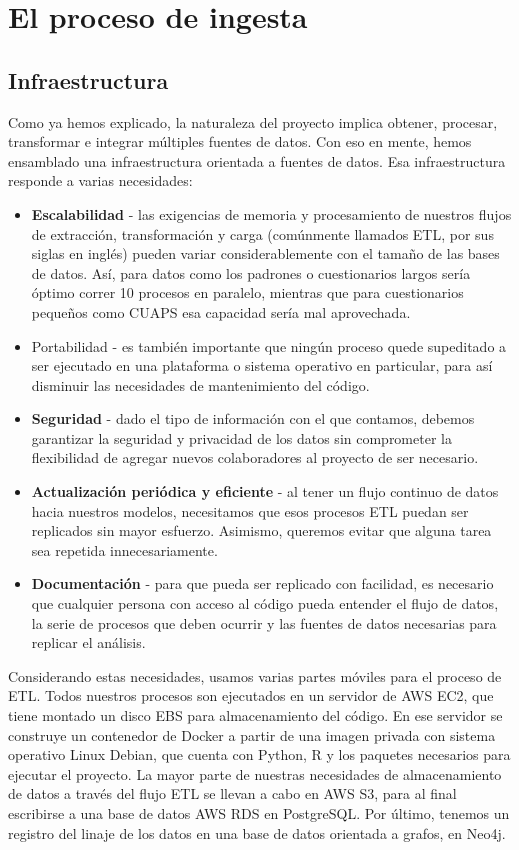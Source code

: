 \chapter*{El proceso de ingesta}
\label{chap:ingesta}
\section*{Infraestructura}
Como ya hemos explicado, la naturaleza del proyecto implica obtener, procesar, transformar e integrar múltiples fuentes de datos. Con eso en mente, hemos ensamblado una infraestructura orientada a fuentes de datos. Esa infraestructura responde a varias necesidades:
\begin{itemize}
    \item \textbf{Escalabilidad} - las exigencias de memoria y procesamiento de nuestros flujos de extracción, transformación y carga (comúnmente llamados ETL, por sus siglas en inglés) pueden variar considerablemente con el tamaño de las bases de datos. Así, para datos como los padrones o cuestionarios largos sería óptimo correr 10 procesos en paralelo, mientras que para cuestionarios pequeños como CUAPS esa capacidad sería mal aprovechada.
    \item Portabilidad - es también importante que ningún proceso quede supeditado a ser ejecutado en una plataforma o sistema operativo en particular, para así disminuir las necesidades de mantenimiento del código.
    \item \textbf{Seguridad} - dado el tipo de información con el que contamos, debemos garantizar la seguridad y privacidad de los datos sin comprometer la flexibilidad de agregar nuevos colaboradores al proyecto de ser necesario.
    \item \textbf{Actualización periódica y eficiente} - al tener un flujo continuo de datos hacia nuestros modelos, necesitamos que esos procesos ETL puedan ser replicados sin mayor esfuerzo. Asimismo, queremos evitar que alguna tarea sea repetida innecesariamente.
    \item \textbf{Documentación} - para que pueda ser replicado con facilidad, es necesario que cualquier persona con acceso al código pueda entender el flujo de datos, la serie de procesos que deben ocurrir y las fuentes de datos necesarias para replicar el análisis.
\end{itemize}
Considerando estas necesidades, usamos varias partes móviles para el proceso de ETL. Todos nuestros procesos son ejecutados en un servidor de AWS EC2, que tiene montado un disco EBS para almacenamiento del código. En ese servidor se construye un contenedor de Docker a partir de una imagen privada con sistema operativo Linux Debian, que cuenta con Python, R y los paquetes necesarios para ejecutar el proyecto. La mayor parte de nuestras necesidades de almacenamiento de datos a través del flujo ETL se llevan a cabo en AWS S3, para al final escribirse a una base de datos AWS RDS en PostgreSQL. Por último, tenemos un registro del linaje de los datos en una base de datos orientada a grafos, en Neo4j.
